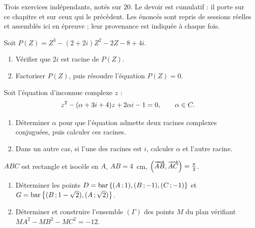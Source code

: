 \begin{devoir}[2 heures]
Trois exercices indépendants, notés sur $20$. Le devoir est cumulatif : il porte sur ce chapitre et sur ceux qui le précèdent. Les énoncés sont repris de sessions réelles et assemblés ici en épreuve ; leur provenance est indiquée à chaque fois.

Soit $P(Z) = Z^{3}-(2+2i)Z^{2}-2Z-8+4i$.
\begin{enumerate}[label=\textbf{\arabic*)}, leftmargin=*, itemsep=0.15em]
  \item Vérifier que $2i$ est racine de $P(Z)$.
  \item Factoriser $P(Z)$, puis résoudre l'équation $P(Z) = 0$.
\end{enumerate}

Soit l'équation d'inconnue complexe $z$ :
\[
  z^{2}-(\alpha+3i+4)z+2\alpha i-1 = 0, \qquad \alpha \in C .
\]
\begin{enumerate}[label=\textbf{\alph*)}, leftmargin=*, itemsep=0.15em]
  \item Déterminer $\alpha$ pour que l'équation admette deux racines
        complexes conjuguées, puis calculer ces racines.
  \item Dans un autre cas, si l'une des racines est $i$, calculer $\alpha$ et
        l'autre racine.
\end{enumerate}

$ABC$ est rectangle et isocèle en $A$, $AB = 4$~cm,
$\left(\overrightarrow{AB},\overrightarrow{AC}\right) = \frac{\pi}{2}$.
\begin{enumerate}[label=\textbf{\alph*)}, leftmargin=*, itemsep=0.15em]
  \item Déterminer les points
        $D = \operatorname{bar}\left\{(A\,;1),(B\,;-1),(C\,;-1)\right\}$ et
        $G = \operatorname{bar}\left\{(B\,;1-\sqrt2),(A\,;\sqrt2)\right\}$.
  \item Déterminer et construire l'ensemble $(\Gamma)$ des points $M$ du plan
        vérifiant $MA^{2}-MB^{2}-MC^{2} = -12$.
\end{enumerate}

\end{devoir}

